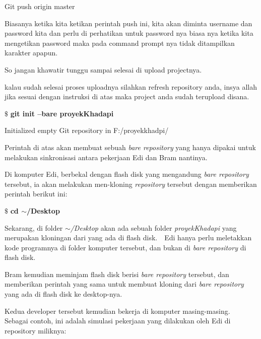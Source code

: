 Git push origin master  \par
\noindent 
Biasanya ketika kita ketikan perintah push ini, kita akan diminta username dan password kita dan perlu di perhatikan untuk password nya biasa nya ketika kita mengetikan password maka pada command prompt nya tidak ditampilkan karakter apapun. \par
\noindent 
So jangan khawatir tunggu sampai selesai di upload projectnya. \par
\noindent 
kalau sudah selesai proses uploadnya silahkan refresh repository anda, insya allah jika sesuai dengan instruksi di atas maka project anda sudah terupload disana. \par
\vspace{12pt}
\vspace{12pt}
\noindent 
 $  \$  $ \textbf{git init --bare proyekKhadapi} \par
\noindent 
Initialized empty Git repository in F:/proyekkhadpi/ \par
\noindent 
Perintah di atas akan membuat sebuah \textit{bare repository} yang hanya dipakai untuk melakukan sinkronisasi antara pekerjaan Edi dan Bram nantinya. \par
\vspace{12pt}
\noindent 
Di komputer Edi, berbekal dengan flash disk yang mengandung \textit{bare repository} tersebut, ia akan melakukan men-kloning \textit{repository} tersebut dengan memberikan perintah berikut ini: \par
\noindent 
 $  \$  $ \textbf{cd  $  \sim  $/Desktop} \par
\noindent 
\noindent 
\vspace{12pt}
\noindent 
\vspace{12pt}
\noindent 
Sekarang, di folder\textit{  $  \sim  $/Desktop} akan ada sebuah folder \textit{proyek}\textit{Khadapi} yang merupakan kloningan dari yang ada di flash disk. $  $ $  $ Edi hanya perlu meletakkan kode programnya di folder komputer tersebut, dan bukan di \textit{bare repository} di flash disk. \par
\vspace{12pt}
\noindent 
Bram kemudian meminjam flash disk berisi \textit{bare repository} tersebut, dan memberikan perintah yang sama untuk membuat kloning dari \textit{bare repository} yang ada di flash disk ke desktop-nya. \par
\vspace{12pt}
\noindent 
Kedua developer tersebut kemudian bekerja di komputer masing-masing. $  $ $  $ Sebagai contoh, ini adalah simulasi pekerjaan yang dilakukan oleh Edi di repository miliknya: \par
